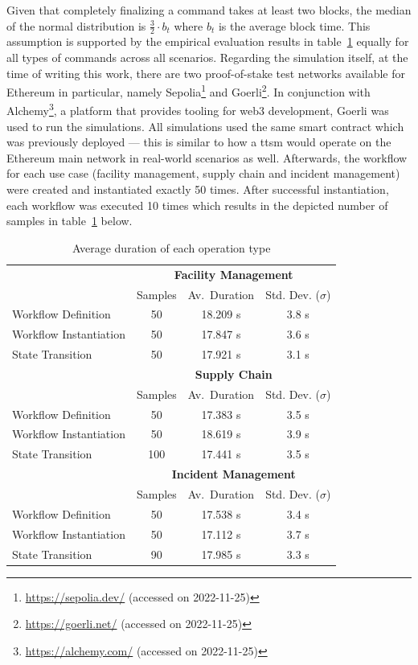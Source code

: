 Given that completely finalizing a command takes at least two blocks, the median of the normal distribution is $\frac{3}{2} \cdot b_t$ where $b_t$ is the average block time. This assumption is supported by the empirical evaluation results in table~\ref{tab:evaluation:simulations:transaction_inclusion_duration} equally for all types of commands across all scenarios. Regarding the simulation itself, at the time of writing this work, there are two proof-of-stake test networks available for Ethereum in particular, namely Sepolia\footnote{\url{https://sepolia.dev/} (accessed on 2022-11-25)} and Goerli\footnote{\url{https://goerli.net/} (accessed on 2022-11-25)}. In conjunction with Alchemy\footnote{\url{https://alchemy.com/} (accessed on 2022-11-25)}, a platform that provides tooling for web3 development, Goerli was used to run the simulations. All simulations used the same smart contract which was previously deployed --- this is similar to how a \gls{ttsm} would operate on the Ethereum main network in real-world scenarios as well. Afterwards, the workflow for each use case (facility management, supply chain and incident management) were created and instantiated exactly 50 times. After successful instantiation, each workflow was executed 10 times which results in the depicted number of samples in table~\ref{tab:evaluation:simulations:transaction_inclusion_duration} below.

\begin{table}[h]
\centering
\begin{tabular}{|l|c|c|c|}
    \hline
    & \multicolumn{3}{c|}{\bfseries Facility Management} \\ \cline{2-4}
    & Samples & Av.\ Duration & Std. Dev. ($\sigma$) \\
    \hline
    Workflow Definition    & 50  & 18.209 s & 3.8 s \\
    Workflow Instantiation & 50  & 17.847 s & 3.6 s \\
    State Transition       & 50  & 17.921 s & 3.1 s \\
    \hline
    & \multicolumn{3}{c|}{\bfseries Supply Chain} \\ \cline{2-4}
    & Samples & Av.\ Duration & Std. Dev. ($\sigma$) \\
    \hline
    Workflow Definition    & 50  & 17.383 s & 3.5 s \\
    Workflow Instantiation & 50  & 18.619 s & 3.9 s \\
    State Transition       & 100 & 17.441 s & 3.5 s \\
    \hline
    & \multicolumn{3}{c|}{\bfseries Incident Management} \\ \cline{2-4}
    & Samples & Av.\ Duration & Std. Dev. ($\sigma$) \\
    \hline
    Workflow Definition    & 50  & 17.538 s & 3.4 s \\
    Workflow Instantiation & 50  & 17.112 s & 3.7 s \\
    State Transition       & 90  & 17.985 s & 3.3 s \\
    \hline
\end{tabular}
\caption{Average duration of each operation type}
\label{tab:evaluation:simulations:transaction_inclusion_duration}
\end{table}

